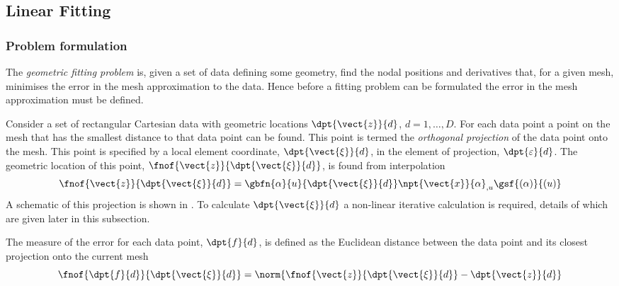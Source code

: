 \subsection{Linear Fitting}

\subsubsection{Problem formulation}

The \emph{geometric fitting problem} is, given a set of data defining some
geometry, find the nodal positions and derivatives that, for a given mesh,
minimises the error in the mesh approximation to the data. Hence before a
fitting problem can be formulated the error in the mesh approximation must be
defined.

Consider a set of rectangular Cartesian data with geometric locations
$\dpt{\vect{z}}{d}$, $d=1,\ldots,D$. For each data point a point on the mesh
that has the smallest distance to that data point can be found. This point is
termed the \emph{orthogonal projection} of the data point onto the mesh. This
point is specified by a local element coordinate, $\dpt{\vect{\xi}}{d}$, in
the element of projection, $\dpt{\varepsilon}{d}$. The geometric location of
this point, $\fnof{\vect{z}}{\dpt{\vect{\xi}}{d}}$, is found from
interpolation \ie
\begin{equation}
  \fnof{\vect{z}}{\dpt{\vect{\xi}}{d}}=\gbfn{\alpha}{u}{\dpt{\vect{\xi}}{d}}
  \npt{\vect{x}}{\alpha}_{,u}\gsf{(\alpha)}{(u)}
  \label{eqn:dataprojectionpos}
\end{equation}
A schematic of this projection is shown in .  To
calculate $\dpt{\vect{\xi}}{d}$ a non-linear iterative calculation is
required, details of which are given later in this subsection.


The measure of the error for each data point, $\dpt{f}{d}$, is defined as the
Euclidean distance between the data point and its closest projection onto the
current mesh \ie
\begin{equation}
  \fnof{\dpt{f}{d}}{\dpt{\vect{\xi}}{d}}=\norm{\fnof{\vect{z}}{
      \dpt{\vect{\xi}}{d}}-\dpt{\vect{z}}{d}}
\end{equation}

